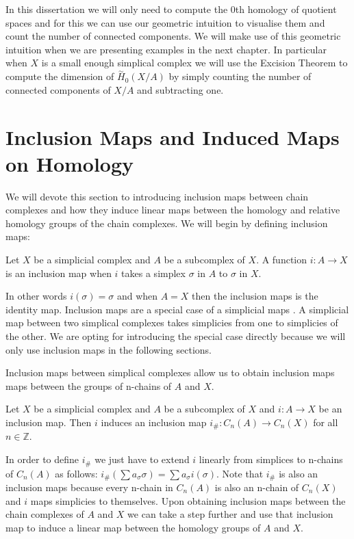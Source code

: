 In this dissertation we will only need to compute the 0th homology of quotient spaces and for this we can use our geometric intuition to visualise them and count the number of connected components. We will make use of this geometric intuition when we are presenting examples in the next chapter. In particular when $X$ is a small enough simplical complex we will use the Excision Theorem to compute the dimension of $\overset{\sim}{H}_0(X/A)$ by simply counting the number of connected components of $X/A$ and subtracting one.


\section{Inclusion Maps and Induced Maps on Homology}


We will devote this section to introducing inclusion maps between chain complexes and how they induce linear maps between the homology and relative homology groups of the chain complexes. We will begin by defining inclusion maps:

\begin{defn} Let $X$ be a simplicial complex and $A$ be a subcomplex of $X$. A function $i: A \to X$ is an inclusion map when $i$ takes a simplex $\sigma$ in $A$ to $\sigma$ in $X$.
\end{defn}

In other words $i(\sigma) = \sigma$ and when $A = X$ then the inclusion maps is the identity map. Inclusion maps are a special case of a simplicial maps \cite{combinatorial-algebraic-topology}. A simplicial map between two simplical complexes takes simplicies from one to simplicies of the other. We are opting for introducing the special case directly because we will only use inclusion maps in the following sections.

Inclusion maps between simplical complexes allow us to obtain inclusion maps maps between the groups of n-chains of $A$ and $X$.

\begin{defn} Let $X$ be a simplicial complex and $A$ be a subcomplex of $X$ and $i: A \to X$ be an inclusion map. Then $i$ induces an inclusion map $i_\#: C_n(A) \to C_n(X)$ for all $n \in \mathbb{Z}$. \end{defn}

In order to define $i_\#$ we just have to extend $i$ linearly from simplices to n-chains of $C_n(A)$ as follows: $i_\#(\sum a_\sigma \sigma) = \sum a_\sigma i(\sigma)$. Note that $i_\#$ is also an inclusion maps because every n-chain in $C_n(A)$ is also an n-chain of $C_n(X)$ and $i$ maps simplicies to themselves. Upon obtaining inclusion maps between the chain complexes of $A$ and $X$ we can take a step further and use that inclusion map to induce a linear map between the homology groups of $A$ and $X$.

